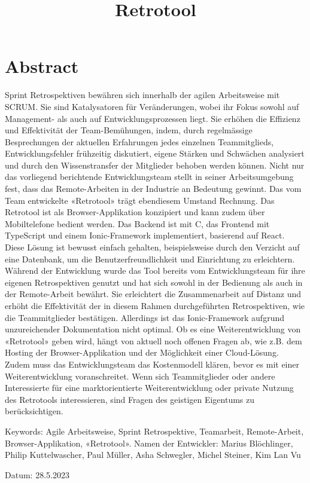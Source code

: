 \documentclass{article}[11pt,paper=A4, margin=1cm]
\begin{document}
\section{Abstract}
\title{Retrotool}
Sprint Retrospektiven bewähren sich innerhalb der agilen Arbeitsweise mit SCRUM. Sie sind Katalysatoren für Veränderungen, wobei ihr Fokus sowohl auf Management- als auch auf Entwicklungsprozessen liegt. Sie erhöhen die Effizienz und Effektivität der Team-Bemühungen, indem, durch regelmässige Besprechungen der aktuellen Erfahrungen jedes einzelnen Teammitglieds, Entwicklungsfehler frühzeitig diskutiert, eigene Stärken und Schwächen analysiert und durch den Wissenstransfer der Mitglieder behoben werden können. Nicht nur das vorliegend berichtende Entwicklungsteam stellt in seiner Arbeitsumgebung fest, dass das Remote-Arbeiten in der Industrie an Bedeutung gewinnt. Das vom Team entwickelte «Retrotool» trägt ebendiesem Umstand Rechnung. Das Retrotool ist als Browser-Applikation konzipiert und kann zudem über Mobiltelefone bedient werden. Das Backend ist mit C, das Frontend mit TypeScript und einem Ionic-Framework implementiert, basierend auf React. Diese Lösung ist bewusst einfach gehalten, beispielsweise durch den Verzicht auf eine Datenbank, um die Benutzerfreundlichkeit und Einrichtung zu erleichtern. Während der Entwicklung wurde das Tool bereits vom Entwicklungsteam für ihre eigenen Retrospektiven genutzt und hat sich sowohl in der Bedienung als auch in der Remote-Arbeit bewährt. Sie erleichtert die Zusammenarbeit auf Distanz und erhöht die Effektivität der in diesem Rahmen durchgeführten Retrospektiven, wie die Teammitglieder bestätigen. Allerdings ist das Ionic-Framework aufgrund unzureichender Dokumentation nicht optimal. Ob es eine Weiterentwicklung von «Retrotool» geben wird, hängt von aktuell noch offenen Fragen ab, wie z.B. dem Hosting der Browser-Applikation und der Möglichkeit einer Cloud-Lösung. Zudem muss das Entwicklungsteam das Kostenmodell klären, bevor es mit einer Weiterentwicklung voranschreitet. Wenn sich Teammitglieder oder andere Interessierte für eine marktorientierte Weiterentwicklung oder private Nutzung des Retrotools interessieren, sind Fragen des geistigen Eigentums zu berücksichtigen.

\newline
\newline
Keywords: Agile Arbeitsweise, Sprint Retrospektive, Teamarbeit, Remote-Arbeit, Browser-Applikation, «Retrotool». 
Namen der Entwickler: Marius Blöchlinger, Philip Kuttelwascher, Paul Müller, Asha Schwegler, Michel Steiner, Kim Lan Vu 

Datum: 28.5.2023
\end{document}
